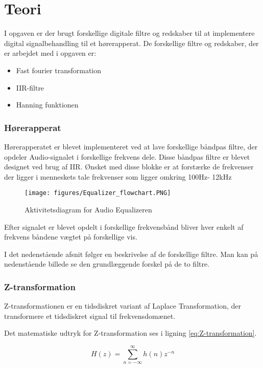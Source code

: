 \chapter{Teori}\label{ch:Teori}

I opgaven er der brugt forskellige digitale filtre og redskaber til at implementere digital signalbehandling til et hørerapperat. De forskellige filtre og redskaber, der er arbejdet med i opgaven er:
\begin{itemize}
\item Fast fourier transformation
\item IIR-filtre
\item Hanning funktionen
\end{itemize}

\subsection{Hørerapperat}
Hørerapperatet er blevet implementeret ved at lave forskellige båndpas filtre, der opdeler Audio-signalet i forskellige frekvens dele. Disse båndpas filtre er blevet designet ved brug af IIR. Ønsket med disse blokke er at forstærke de frekvenser der ligger i menneskets tale frekvenser som ligger omkring 100Hz- 12kHz 

\begin{figure}[H]
	\centering
	\texttt{[image: figures/Equalizer\_flowchart.PNG]}
	\caption{Aktivitetsdiagram for Audio Equalizeren}
	\label{fig:Aktivitetsdiagram for Equalizeren}
\end{figure}

Efter signalet er blevet opdelt i forskellige frekvensbånd bliver hver enkelt af frekvens båndene vægtet på forskellige vis.

I det nedenstående afsnit følger en beskrivelse af de forskellige filtre. Man kan på nedenstående billede  se den grundlæggende forskel på de to filtre.


\subsection{Z-transformation}
Z-transformationen er en tidsdiskret variant af Laplace Transformation, der transformere et tidsdiskret signal til frekvensdomænet.

Det matematiske udtryk for Z-transformation ses i ligning \ref{eq:Z-transformation}.

\begin{equation}\label{eq:Z-transformation}
{H(z)} = \displaystyle\sum_{n=-\infty }^{\infty} {h(n)z^{-n}}
\end{equation}
 

